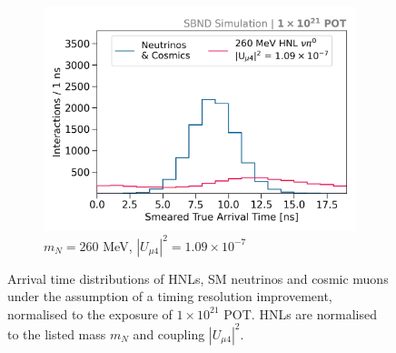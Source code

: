 \begin{figure}[htbp!]
\begin{subfigure}[b]{0.495\textwidth}
            \includegraphics[width=\textwidth]{m260}
            \caption{$m_N = 260$ MeV, $|U_{\mu4}|^2 = 1.09 \times 10^{-7}$ }
        \end{subfigure}
        \caption[Smeared True Arrival Time Distributions in the Mass Range 180 - 260 MeV]{
	Arrival time distributions of HNLs, SM neutrinos and cosmic muons under the assumption of a timing resolution improvement, normalised to the exposure of $1 \times 10^{21}$ POT.
	HNLs are normalised to the listed mass $m_N$ and coupling $|U_{\mu4}|^2$.
	}
\end{figure}
